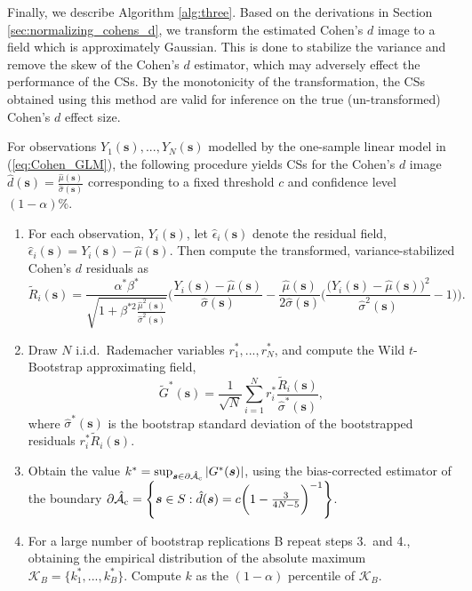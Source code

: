 Finally, we describe Algorithm \ref{alg:three}. Based on the derivations in Section \ref{sec:normalizing_cohens_d}, we transform the estimated Cohen's $d$ image to a field which is approximately Gaussian. This is done to stabilize the variance and remove the skew of the Cohen's $d$ estimator, which may adversely effect the performance of the CSs. By the monotonicity of the transformation, the CSs obtained using this method are valid for inference on the true (un-transformed) Cohen's $d$ effect size. 

\begin{algorithm}
\label{alg:three}
For observations $Y_{1}(\bm{s}), ..., Y_{N}(\bm{s})$ modelled by the one-sample linear model in (\ref{eq:Cohen_GLM}), the following procedure yields CSs for the Cohen's $d$ image $\hat{d}(\bm{s}) = \frac{\hat{\mu}(\bm{s})}{\hat{\sigma}(\bm{s})}$ corresponding to a fixed threshold $c$ and confidence level $(1 - \alpha)\%$.
\begin{enumerate}
\item For each observation, $Y_i(\bm{s})$, let $\hat{\epsilon}_{i}(\bm{s})$ denote the residual field, $\hat{\epsilon}_{i}(\bm{s}) = Y_{i}(\bm{s}) - \hat{\mu}(\bm{s})$. Then compute the transformed, variance-stabilized Cohen's $d$ residuals as
$$\tilde{R}_{i}(\bm{s}) = \frac{\alpha^{*}\beta^{*}}{\sqrt{1 + \beta^{*2}\frac{\hat{\mu}^{2}(\bm{s})}{\hat{\sigma}^{2}(\bm{s})}}} \Bigg(\frac{Y_{i}(\bm{s}) - \hat{\mu}(\bm{s})}{\hat{\sigma}(\bm{s})} - \frac{\hat{\mu}(\bm{s})}{2\hat{\sigma}(\bm{s})}\Bigg( \frac{\big(Y_{i}(\bm{s}) - \hat{\mu}(\bm{s})\big)^{2}}{\hat{\sigma}^{2}(\bm{s})} - 1 \Bigg)\Bigg).$$ 
\item Draw $N$ i.i.d.\ Rademacher variables $r_{1}^{*}, ..., r_{N}^{*}$, and compute the Wild $t$-Bootstrap approximating field,
$$\tilde{G}^{*}(\bm{s}) = \frac{1}{\sqrt{N}}\sum_{i=1}^{N} r^*_i\frac{\tilde{R}_{i}(\bm{s})}{\hat{\sigma}^*(\bm{s})},$$
where $\hat{\sigma}^{*}(\bm{s})$ is the bootstrap standard deviation of the bootstrapped residuals $r_{i}^{*}\tilde{R}_{i}(\bm{s})$. 
\item Obtain the value $k^{*} = \sup_{\bm{s}\in\operatorname{\partial\hat{\mathcal{A}}_{c}}}|G^{*}(\bm{s})|$, using the bias-corrected estimator of the boundary $\operatorname{\partial\hat{\mathcal{A}}_{c}} = \Bigg\{\bm{s} \in S : \hat{d}(\bm{s}) = c\bigg(1 - \frac{3}{4N - 5}\bigg)^{-1} \Bigg\}$.
\item For a large number of bootstrap replications B repeat steps 3.\ and 4., obtaining the empirical distribution of the absolute maximum $\mathcal{K}_{B} = \{k_{1}^{*}, ..., k_{B}^{*}\}$. Compute $k$ as the $(1 - \alpha)$ percentile of $\mathcal{K}_{B}$.

\end{enumerate}
\end{algorithm}
